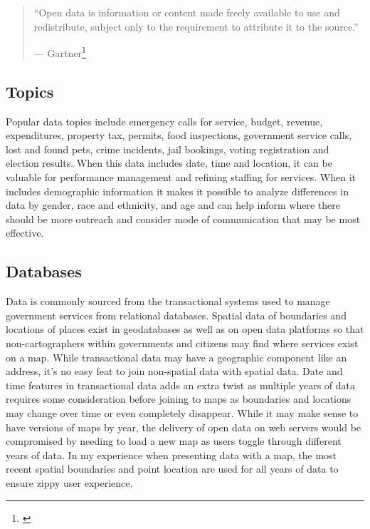 \documentclass[
  openany]{book}
\begin{document}
\begin{quote}
``Open data is information or content made freely available to use and redistribute, subject only to the requirement to attribute it to the source.''

--- Gartner\footnote{\citet{gartner_opendata}}
\end{quote}

\hypertarget{topics}{%
\subsection{Topics}\label{topics}}

Popular data topics include emergency calls for service, budget, revenue, expenditures, property tax, permits, food inspections, government service calls, lost and found pets, crime incidents, jail bookings, voting registration and election results. When this data includes date, time and location, it can be valuable for performance management and refining staffing for services. When it includes demographic information it makes it possible to analyze differences in data by gender, race and ethnicity, and age and can help inform where there should be more outreach and consider mode of communication that may be most effective.

\hypertarget{databases}{%
\subsection{Databases}\label{databases}}

Data is commonly sourced from the transactional systems used to manage government services from relational databases.
Spatial data of boundaries and locations of places exist in geodatabases as well as on open data platforms so that non-cartographers within governments and citizens may find where services exist on a map. While transactional data may have a geographic component like an address, it's no easy feat to join non-spatial data with spatial data. Date and time features in transactional data adds an extra twist as multiple years of data requires some consideration before joining to maps as boundaries and locations may change over time or even completely disappear. While it may make sense to have versions of maps by year, the delivery of open data on web servers would be compromised by needing to load a new map as users toggle through different years of data. In my experience when presenting data with a map, the most recent spatial boundaries and point location are used for all years of data to ensure zippy user experience.
\end{document}
